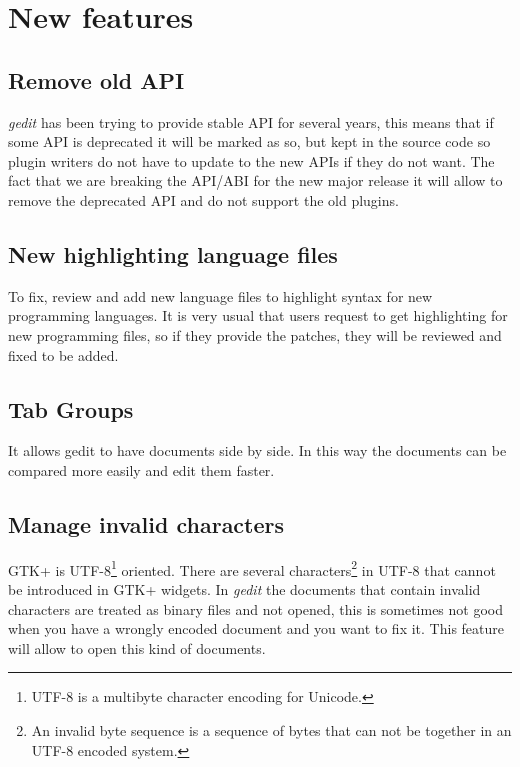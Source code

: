 
\section{New features}\label{sec:NewFeatures}

\subsection{Remove old API}\label{sec:RemoveOldAPI}

\emph{gedit} has been trying to provide stable API for several years, this means that if some API is deprecated it will be marked as so, but kept in the source code so plugin writers do not have to update to the new APIs if they do not want. The fact that we are breaking the API/ABI for the new major release it will allow to remove the deprecated API and do not support the old plugins.

\subsection{New highlighting language files}\label{sec:HighFiles}

To fix, review and add new language files to highlight syntax for new programming languages. It is very usual that users request to get highlighting for new programming files, so if they provide the patches, they will be reviewed and fixed to be added.

\subsection{Tab Groups}\label{sec:TabGroups}

It allows gedit to have documents side by side. In this way the documents can be compared more easily and edit them faster.

\subsection{Manage invalid characters}\label{sec:InvalidChars}

GTK+ is UTF-8\footnote{UTF-8 is a multibyte character encoding for Unicode.} oriented. There are several characters\footnote{An invalid byte sequence is a sequence of bytes that can not be together in an UTF-8 encoded system.} in UTF-8 that cannot be introduced in GTK+ widgets. In \emph{gedit} the documents that contain invalid characters are treated as binary files and not opened, this is sometimes not good when you have a wrongly encoded document and you want to fix it. This feature will allow to open this kind of documents.

